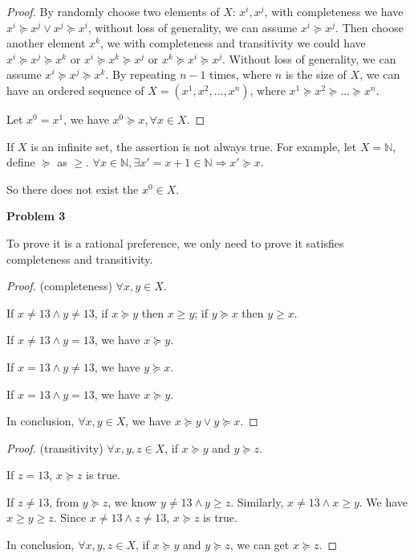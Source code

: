 \documentclass[letterpaper, 11pt]{article}
\newcommand{\1}{\mathds{1}}	%
\theoremstyle{definition}
\begin{document}
\begin{proof}
  By randomly choose two elements of $X$: $x^i, x^j$, with completeness we have $x^i \succeq x^j \vee x^j \succeq x^i$, without loss of generality, we can assume $x^i \succeq x^j$. Then choose another element $x^k$, we with completeness and transitivity we could have $x^i \succeq x^j \succeq x^k$ or $x^i \succeq x^k \succeq x^j$ or $x^k \succeq x^i \succeq x^j$. Without loss of generality, we can assume $x^i \succeq x^j \succeq x^k$. By repeating $n-1$ times, where $n$ is the size of $X$, we can have an ordered sequence of $X = (x^1, x^2, \dots, x^n)$, where $x^1 \succeq x^2 \succeq \dots \succeq x^n$.

  Let $x^0 = x^1$, we have $x^0 \succeq x, \forall x \in X$.
\end{proof}

If $X$ is an infinite set, the assertion is not always true. For example, let $X = \mathbb{N}$, define $\succeq$ as $\ge$. $\forall x \in \mathbb{N}, \exists x' = x+1 \in \mathbb{N} \Longrightarrow x' \succeq x$.

So there does not exist the $x^0 \in X$.


\textbf{Problem 3}

To prove it is a rational preference, we only need to prove it satisfies completeness and transitivity.

\begin{proof}
  (completeness) $\forall x,y \in X$.

  If $x \neq 13 \wedge y \neq 13$, if $x \succeq y$ then $x \geq y$; if $y \succeq x$ then $y \geq x$.

  If $x \neq 13 \wedge y = 13$, we have $x \succeq y$.

  If $x = 13 \wedge y \neq 13$, we have $y \succeq x$.

  If $x = 13 \wedge y = 13$, we have $x \succeq  y$.

  In conclusion, $\forall x, y \in X$, we have $x \succeq y \vee y \succeq x$.
\end{proof}

\begin{proof}
  (transitivity) $\forall x,y,z \in X$, if $x \succeq y$ and $y \succeq z$.

  If $z = 13$, $x \succeq z$ is true.

  If $z \neq 13$, from $y \succeq z$, we know $y \neq 13 \wedge y \geq z$. Similarly, $x \neq 13 \wedge x \geq y$. We have $x \geq y \geq z$. Since $x \neq 13 \wedge z \neq 13$, $x \succeq z$ is true.

  In conclusion, $\forall x,y,z \in X$, if $x \succeq y$ and $y \succeq z$, we can get $x \succeq z$.
\end{proof}


\end{document}
